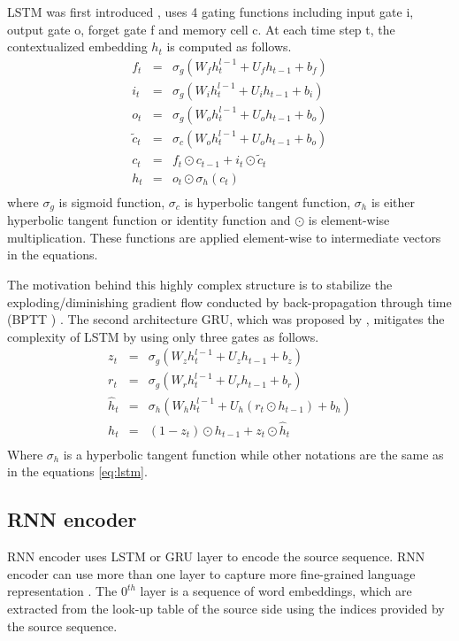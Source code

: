 LSTM was first introduced \cite{Hochreiter97long}, uses 4 gating functions including input gate i, output gate o, forget gate f and memory cell c. At each time step t, the contextualized embedding $h_t$ is computed as follows.
\begin{equation}
\label{eq:lstm}
\begin{array}{rcl}
f_t &=& \sigma_g (W_f h^{l-1}_t + U_f h_{t-1} + b_f)\\
i_t &=& \sigma_g (W_i h^{l-1}_t + U_i h_{t-1} + b_i)\\
o_t &=& \sigma_g (W_o h^{l-1}_t + U_o h_{t-1} + b_o)\\
\tilde{c}_t &=& \sigma_c (W_o h^{l-1}_t + U_o h_{t-1} + b_o)\\
c_t &=& f_t \odot c_{t-1} + i_t \odot \tilde{c}_t\\
h_t &=& o_t \odot \sigma_h(c_t)\\
\end{array}
\end{equation}
where $\sigma_g$ is sigmoid function, $\sigma_c$ is hyperbolic tangent function, $\sigma_h$ is either hyperbolic tangent function or identity function and $\odot$ is element-wise multiplication. These functions are applied element-wise to intermediate vectors in the equations.

The motivation behind this highly complex structure is to stabilize the exploding/diminishing gradient flow \citep{Pascanu13onthe} conducted by back-propagation through time (BPTT ) \cite{Hochreiter97long}. The second architecture GRU, which was proposed by \cite{Cho14properties}, mitigates the complexity of LSTM by using only three gates as follows.
\begin{equation}
\label{eq:gru}
\begin{array}{rcl}
z_t &=& \sigma_g (W_z h^{l-1}_t + U_z h_{t-1} + b_z)\\
r_t &=& \sigma_g (W_r h^{l-1}_t + U_r h_{t-1} + b_r)\\
\hat{h}_t &=& \sigma_h (W_h h^{l-1}_t + U_h (r_t \odot h_{t-1}) + b_h)\\
h_t &=& (1-z_t)\odot h_{t-1} + z_t \odot \hat{h}_t\\
\end{array}
\end{equation}
Where $\sigma_h$ is a hyperbolic tangent function while other notations are the same as in the equations \ref{eq:lstm}.
\subsection{RNN encoder}
RNN encoder uses LSTM or GRU layer to encode the source sequence. RNN encoder can use more than one layer to capture more fine-grained language representation \cite{Li20shallow}. The $0^{th}$ layer is a sequence of word embeddings, which are extracted from the look-up table of the source side using the indices provided by the source sequence. 

